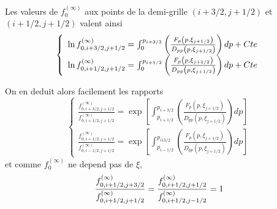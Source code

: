 Les valeurs de $f_{0}^{(\infty)}$ aux points de la demi-grille $%
\left(i+3/2,j+1/2\right)$ et $\left(i+1/2,j+1/2\right)$ valent ainsi 
\[
\left\{ 
\begin{array}{l}
\ln f_{0,i+3/2,j+1/2}^{(\infty)}=\int_{0}^{p_{i+3/2}}\left(\frac{%
F_{p}\left(p,\xi_{j+1/2}\right)}{D_{pp}\left(p,\xi_{j+1/2}\right)}%
\right)dp+Cte \\ 
\ln f_{0,i+1/2,j+1/2}^{(\infty)}=\int_{0}^{p_{i+1/2}}\left(\frac{%
F_{p}\left(p,\xi_{j+1/2}\right)}{D_{pp}\left(p,\xi_{j+1/2}\right)}%
\right)dp+Cte
\end{array}
\right.
\]

On en deduit alors facilement les rapports 
\[
\left\{ 
\begin{array}{l}
\frac{f_{0,i+3/2,j+1/2}^{(\infty)}}{f_{0,i+1/2,j+1/2}^{(\infty)}}%
=\exp\left[\int_{p_{i+1/2}}^{p_{i+3/2}}\left(\frac{F_{p}\left(p,\xi_{j+1/2}%
\right)}{D_{pp}\left(p,\xi_{j+1/2}\right)}\right)dp\right] \\ 
\frac{f_{0,i+1/2,j+1/2}^{(\infty)}}{f_{0,i-1/2,j+1/2}^{(\infty)}}%
=\exp\left[\int_{p_{i-1/2}}^{p_{i13/2}}\left(\frac{F_{p}\left(p,\xi_{j+1/2}%
\right)}{D_{pp}\left(p,\xi_{j+1/2}\right)}\right)dp\right]
\end{array}
\right.
\]
et comme $f_{0}^{(\infty)}$ ne depend pas de $\xi,$ 
\[
\frac{f_{0,i+1/2,j+3/2}^{(\infty)}}{f_{0,i+1/2,j+1/2}^{(\infty)}}=\frac{%
f_{0,i+1/2,j+1/2}^{(\infty)}}{f_{0,i+1/2,j-1/2}^{(\infty)}}=1
\]


